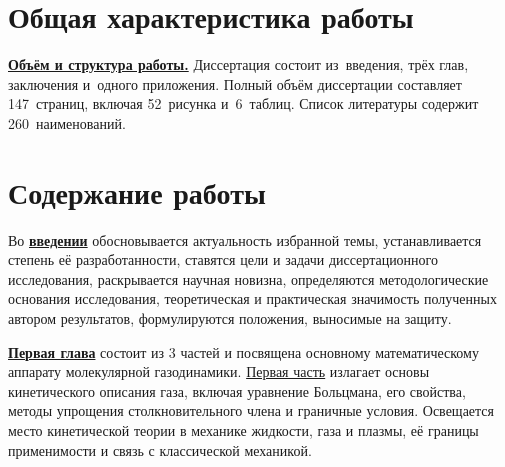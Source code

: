 
\section*{Общая характеристика работы}

\newcommand{\actuality}{\underline{\textbf{\actualityTXT}}}
\newcommand{\progress}{\underline{\textbf{\progressTXT}}}
\newcommand{\aim}{\underline{{\textbf\aimTXT}}}
\newcommand{\tasks}{\underline{\textbf{\tasksTXT}}}
\newcommand{\novelty}{\underline{\textbf{\noveltyTXT}}}
\newcommand{\influence}{\underline{\textbf{\influenceTXT}}}
\newcommand{\methods}{\underline{\textbf{\methodsTXT}}}
\newcommand{\defpositions}{\underline{\textbf{\defpositionsTXT}}}
\newcommand{\reliability}{\underline{\textbf{\reliabilityTXT}}}
\newcommand{\probation}{\underline{\textbf{\probationTXT}}}
\newcommand{\contribution}{\underline{\textbf{\contributionTXT}}}
\newcommand{\publications}{\underline{\textbf{\publicationsTXT}}}
\newcommand{\object}{\underline{\textbf{\objectTXT}}}
\newcommand{\subject}{\underline{\textbf{\subjectTXT}}}



\underline{\textbf{Объём и структура работы.}}
Диссертация состоит из~введения, трёх глав, заключения и~одного приложения.
Полный объём диссертации составляет 147~страниц, включая 52~рисунка и~6~таблиц.
Список литературы содержит 260~наименований.

\section*{Содержание работы}

Во \underline{\textbf{введении}} обосновывается актуальность избранной темы, устанавливается степень её разработанности,
ставятся цели и задачи диссертационного исследования,
раскрывается научная новизна, определяются методологические основания исследования,
теоретическая и практическая значимость полученных автором результатов,
формулируются положения, выносимые на защиту.

\underline{\textbf{Первая глава}} состоит из 3 частей и посвящена основному математическому аппарату молекулярной газодинамики.
\underline{Первая часть} излагает основы кинетического описания газа,
включая уравнение Больцмана, его свойства, методы упрощения столкновительного члена и граничные условия.
Освещается место кинетической теории в механике жидкости, газа и плазмы,
её границы применимости и связь с классической механикой.


